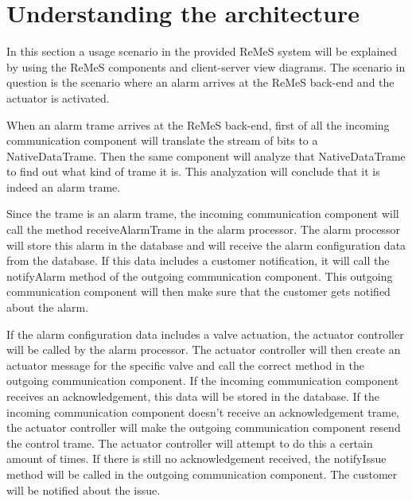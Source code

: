 \section{Understanding the architecture}
In this section a usage scenario in the provided ReMeS system will be explained by using the ReMeS components 
and client-server view diagrams.
The scenario in question is the scenario where an alarm arrives at the ReMeS back-end and the actuator is activated.

When an alarm trame arrives at the ReMeS back-end, first of all the incoming communication component will translate
	the stream of bits to a NativeDataTrame. Then the same component will analyze that NativeDataTrame to find out
	what kind of trame it is. This analyzation will conclude that it is indeed an alarm trame.

Since the trame is an alarm trame, the incoming communication component will call the method receiveAlarmTrame in the
	alarm processor. The alarm processor will store this alarm in the database and will receive the alarm configuration
	data from the database. If this data includes a customer notification, it will call the notifyAlarm method of the
	outgoing communication component. This outgoing communication component will then make sure that the customer gets
	notified about the alarm.

If the alarm configuration data includes a valve actuation, the actuator controller will be called by the alarm processor.
	The actuator controller will then create an actuator message for the specific valve and call the correct method in the
	outgoing communication component. If the incoming communication component receives an acknowledgement, this data will be
	stored in the database. If the incoming communication component doesn't receive an acknowledgement trame, the actuator controller
	will make the outgoing communication component resend the control trame. The actuator controller will attempt to do this
	a certain amount of times. If there is still no acknowledgement received, the notifyIssue method will be called in the
	outgoing communication component. The customer will be notified about the issue.

